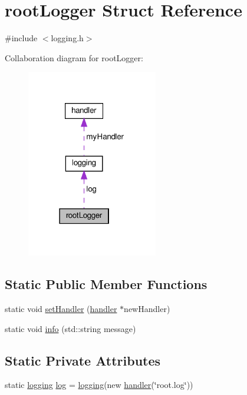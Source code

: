 \hypertarget{structroot_logger}{}\section{root\+Logger Struct Reference}
\label{structroot_logger}


{\ttfamily \#include $<$logging.\+h$>$}



Collaboration diagram for root\+Logger\+:\nopagebreak
\begin{figure}[H]
\begin{center}
\leavevmode
\includegraphics[width=162pt]{d7/ddb/structroot_logger__coll__graph}
\end{center}
\end{figure}
\subsection*{Static Public Member Functions}
\begin{DoxyCompactItemize}
\item 
static void \hyperlink{structroot_logger_a2b12bc69ec8a404d513d7db3ea856be5}{set\+Handler} (\hyperlink{classhandler}{handler} $\ast$new\+Handler)
\item 
static void \hyperlink{structroot_logger_af163fa3b8e6f1c7d4a2d1dd9fe1594ce}{info} (std\+::string message)
\end{DoxyCompactItemize}
\subsection*{Static Private Attributes}
\begin{DoxyCompactItemize}
\item 
static \hyperlink{classlogging}{logging} \hyperlink{structroot_logger_a91e51e01c8b12e95891d79807b93a6f0}{log} = \hyperlink{classlogging}{logging}(new \hyperlink{classhandler}{handler}(\char`\"{}root.\+log\char`\"{}))
\end{DoxyCompactItemize}


